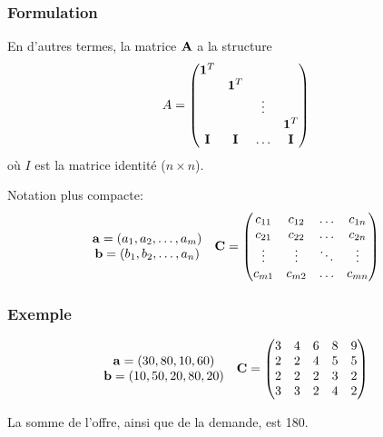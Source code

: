 \documentclass[usepdftitle=false, aspectratio=169]{beamer}
\begin{document}
\begin{frame}
\frametitle{Formulation}

En d'autres termes, la matrice ${\bf A}$ a la structure
\[
A =
\begin{pmatrix}
{\bf 1}^T \\
& {\bf 1}^T \\
& & \vdots \\
& & & {\bf 1}^T \\
{\bf I} & {\bf I} & \ldots & {\bf I}
\end{pmatrix}
\]
où $I$ est la matrice identité ($n \times n$).

\mbox{}

Notation plus compacte:
\[
\begin{matrix}
\begin{matrix}
{\bf a} = (a_1, a_2,\ldots, a_m) \\
{\bf b} = (b_1, b_2,\ldots, a_n) \\
\end{matrix}
&
{\bf C} = 
\begin{pmatrix}
c_{11} & c_{12} & \ldots & c_{1n} \\
c_{21} & c_{22} & \ldots & c_{2n} \\
\vdots & \vdots & \ddots & \vdots \\
c_{m1} & c_{m2} & \ldots & c_{mn} \\
\end{pmatrix}
\end{matrix}
\]

\end{frame}

\begin{frame}
\frametitle{Exemple}

\[
\begin{matrix}
\begin{matrix}
{\bf a} = (30, 80, 10, 60) \\
{\bf b} = (10, 50, 20, 80, 20) \\
\end{matrix}
&
{\bf C} = 
\begin{pmatrix}
3 & 4 & 6 & 8 & 9 \\
2 & 2 & 4 & 5 & 5 \\
2 & 2 & 2 & 3 & 2 \\
3 & 3 & 2 & 4 & 2
\end{pmatrix}
\end{matrix}
\]

\mbox{}

La somme de l'offre, ainsi que de la demande, est 180.

\end{frame}
\end{document}
